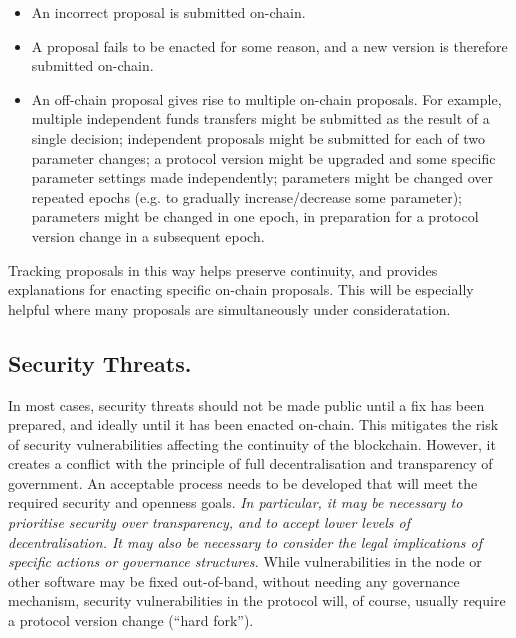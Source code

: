 \begin{itemize}
\item
  An incorrect proposal is submitted on-chain.
\item
  A proposal fails to be enacted for some reason, and a new version is therefore submitted on-chain.
\item
  An off-chain proposal gives rise to multiple on-chain proposals.  For example, multiple independent funds transfers might be submitted as the result of a single
  decision; independent proposals might be submitted for each of two parameter changes; a protocol version might be upgraded and some specific parameter settings made independently;
  parameters might be changed over repeated epochs (e.g. to gradually increase/decrease some parameter); parameters might be changed in one epoch, in preparation for a protocol version
  change in a subsequent epoch.
\end{itemize}

Tracking proposals in this way helps preserve continuity, and provides explanations for enacting specific on-chain proposals.  This will be especially helpful where many proposals
are simultaneously under consideratation.


\subsection{Security Threats.}

In most cases, security threats should not be made public until a fix has been prepared, and ideally until it has been enacted on-chain.  This mitigates the risk of
security vulnerabilities affecting the continuity of the blockchain. However, it creates a conflict with the
principle of full decentralisation and transparency of government.  An acceptable process needs to be developed that will meet the required security and openness goals.
\emph{In particular, it may be necessary to prioritise security over transparency, and to accept lower levels of decentralisation.  It may also be necessary to consider
  the legal implications of specific actions or governance structures.}
While vulnerabilities in the node or other software may be fixed out-of-band, without needing any governance mechanism,
security vulnerabilities in the protocol will, of course, usually require a protocol version change (``hard fork'').


